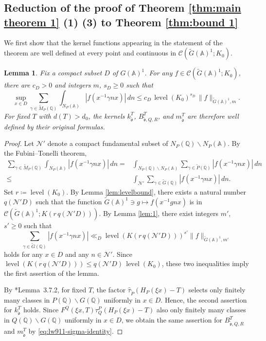 \documentclass[12pt]{amsart}
\theoremstyle{definition}
\theoremstyle{plain}
\newtheorem{lemma}[definition]{Lemma}
\theoremstyle{remark}
\def\Q{\mathbb{Q}}%
\def\A{\mathbb{A}}%
\def\bs{\backslash}%
\newcommand{\cC}{\mathcal{C}}
\newcommand{\cN}{\mathcal{N}}
\numberwithin{equation}{section}
\newcommand{\tG}{\widetilde{G}}
\newcommand{\tM}{\widetilde{M}}
\newcommand{\tP}{\widetilde{P}}
\newcommand{\tfo}{\widetilde{\mathfrak{o}}}
\newcommand{\level}{\operatorname{level}}
\begin{document}
\subsection{Reduction of the proof of Theorem \ref{thm:main theorem 1} (1) (3) to Theorem \ref{thm:bound 1}}\label{sec:reduction(1)(3)}
We first show that the kernel functions appearing in the statement of the theorem are well defined at every point and continuous in $\cC(\tG(\A)^1;K_0)$.
\begin{lemma}\label{lem:sup kernel}
Fix a compact subset $D$ of $G(\A)^1$. 
For any $f\in\cC(\tG(\A)^1;K_0)$, there
are $c_D>0$ and integers $m$, $s_D\geq0$ such that
\[
 \sup_{x\in D}\sum_{\gamma\in \tM_P(\Q)}
       \int_{N_P(\A)}
       |f(x^{-1}\gamma nx)|\,dn
 \le c_D\, \level(K_0)^{s_D} \,
                     \|f\|_{\tG(\A)^1,m}.
\]
For fixed $T$ with $d(T)>d_0$, the kernels $k_{\tfo}^T$, $B_{\tfo,Q,R}^T$, and $m_{\tfo}^T$
are therefore well defined by their original formulas.
\end{lemma}
\begin{proof}
Let $\cN'$ denote a compact fundamental subset of $N_P(\Q)\bs N_P(\A)$. 
By the Fubini--Tonelli theorem,
\begin{align*}
\sum_{\gamma\in \tM_P(\Q)} \int_{N_P(\A)} |f(x^{-1}\gamma nx)|\,dn
       = &\int_{N_P(\Q)\bs N_P(\A)} \sum_{\gamma\in \tP(\Q)}|f(x^{-1}\gamma nx)|\,dn \\
       \le & \int_{\cN'} \sum_{\gamma\in \tG(\Q)}|f(x^{-1}\gamma nx)|\,dn.    
\end{align*}
Set $r\coloneqq \level(K_0)$. 
By Lemma \ref{lem:levelbound}, there exists a natural number $q(\cN'D)$ such that the function $\tG(\A)^1\ni g\mapsto f(x^{-1}g nx)$ is in $\cC(\tG(\A)^1;K(r\, q(\cN'D)))$. 
By Lemma \ref{lem:1}, there exist integers $m'$, $s'\ge 0$ such that
\[
\sum_{\gamma\in \tG(\Q)}|f(x^{-1}\gamma nx)|\ll_D \level(K(r\, q(\cN'D)))^{s'} \|f\|_{\tG(\A)^1,m'}
\]
holds for any $x\in D$ and any $n\in \cN'$. 
Since $\level(K(r\,q(\cN'D)))\le q(\cN'D)\, \level(K_0)$, these two inequalities imply the first assertion of the lemma.

By \cite{LW13}*{Lemma~3.7.2}, for fixed $T$, the factor
$\widehat\tau_{\tP}(H_P(\xi x)-T)$ selects only finitely
many classes in $P(\Q)\backslash G(\Q)$ uniformly
in $x\in D$.
Hence, the second assertion for $ k_{\tfo}^T$ holds. 
Since $F^Q(\xi x,T)\tau_Q^P(H_P(\xi x)-T)$ also only finitely
many classes in $Q(\Q)\backslash G(\Q)$ uniformly
in $x\in D$, we obtain the same assertion for $B_{\tfo,Q,R}^T$ and $m_{\tfo}^T$ by \eqref{eq:lw911-sigma-identity}.
\end{proof}
\end{document}
